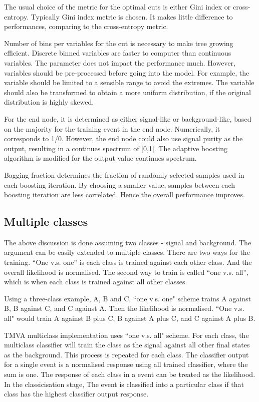 The usual choice of the metric for the optimal cuts is either Gini index or cross-entropy. Typically Gini index metric is chosen. It makes little difference to performances, comparing to the cross-entropy metric.

Number of bins per variables for the cut is necessary to make tree growing efficient. Discrete binned variables are faster to computer than continuous variables. The parameter does not impact the performance much. However, variables should be pre-processed before going into the model. For example, the variable should be limited to a sensible range to avoid the extremes. The variable should also be transformed to obtain a more uniform distribution, if the original distribution is highly skewed.

For the end node, it is determined as either signal-like or background-like, based on the majority for the training event in the end node. Numerically, it corresponds to 1/0. However, the end node could also use signal purity as the output, resulting in a continues spectrum of [0,1]. The adaptive boosting algorithm is modified for the output value continues spectrum.

Bagging fraction determines the fraction of randomly selected samples used in each boosting iteration. By choosing a smaller value, samples between each boosting iteration are less correlated. Hence the overall performance improves.


\subsection{Multiple classes}

The above discussion is done assuming two classes - signal and background. The argument can be easily extended to multiple classes. There are two ways for the training. ``One v.s. one'' is each class is trained against each other class. And the overall likelihood is normalised. The second way to train is called ``one v.s. all'', which is when each class is trained against all other classes.

Using a three-class example, A, B and C, ``one v.s. one" scheme trains A against B, B against C, and C against A. Then the likelihood is normalised. ``One v.s. all" would train A against B plus C, B against A plus C, and C against A plus B.

TMVA multiclass implementation uses ``one v.s. all" scheme. For each class, the multiclass classifier will train the class as the signal against all other final states as the background. This process is repeated for each class. The classifier output for a single event is a normalised response using all trained classifier, where the sum is one. The response of each class in a event can be treated as the likelihood. In the classicisation stage, The event is classified into a particular class if that class has the highest classifier output response.

